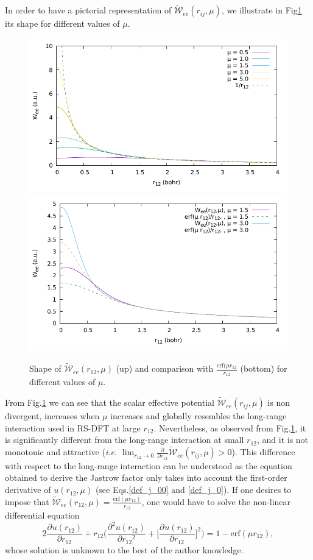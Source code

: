 \documentclass[aip,jcp,reprint,noshowkeys,superscriptaddress]{revtex4-1}
\newcommand{\deriv}[3]{\frac{\partial^{#3} #1}{\partial {#2}^{#3}}}
\begin{document}
In order to have a pictorial representation of $ \tilde{\mathcal{W}}_{ee}(r_{ij},\mu)$, we illustrate in Fig\ref{fig_wee_mu} its shape for different values of $\mu$. 
\begin{figure}
 \label{fig_wee_mu}
        \includegraphics[width=0.45\linewidth]{w_ee.pdf}
        \includegraphics[width=0.45\linewidth]{w_ee_bis.pdf}\\
        \caption{Shape of $\tilde{\mathcal{W}}_{ee}(r_{12},\mu)$ (up) and comparison with $\frac{\text{erf}(\mu r_{12}}{r_{12}}$ (bottom) for different values of $\mu$.}
\end{figure}
From  Fig.\ref{fig_wee_mu} we can see that the scalar effective potential $ \tilde{\mathcal{W}}_{ee}(r_{ij},\mu)$ 
is non divergent, increases when $\mu$ increases and globally resembles the long-range interaction used in RS-DFT at large $r_{12}$. 
Nevertheless, as observed from Fig.\ref{fig_wee_mu}, it is significantly different 
from the long-range interaction at small $r_{12}$, 
and it is not monotonic and attractive (\textit{i.e.} $\lim_{r_{12} \rightarrow 0} \deriv{}{r_{12}}{} \tilde{\mathcal{W}}_{ee}(r_{ij},\mu) >0 $). 
This difference with respect to the long-range interaction can be understood as the equation obtained to derive the Jastrow factor only takes into account the first-order derivative of $u(r_{12},\mu)$ (see Eqs.\eqref{def_j_00} and \eqref{def_j_0}). 
If one desires to impose that $\tilde{\mathcal{W}}_{ee}(r_{12},\mu) = \frac{\text{erf}(\mu r_{12})}{r_{12}}$, one would have to solve the non-linear differential equation 
\begin{equation}
 2 \deriv{u(r_{12})}{r_{12}}{} + r_{12} \bigg( \deriv{u(r_{12})}{r_{12}}{2} + \bigg[ \deriv{u(r_{12})}{r_{12}}{} \bigg]^2\bigg) = 1 - \text{erf}(\mu r_{12}), 
\end{equation}
whose solution is unknown to the best of the author knowledge. 
\end{document}
